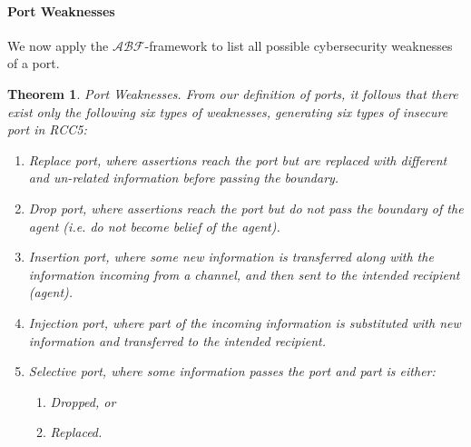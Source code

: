 \documentclass[conference]{IEEEtran}
\newcommand{\assertionRegion}{\mathcal{A}}
\newcommand{\beliefRegion}{\mathcal{B}}
\newcommand{\factRegion}{\mathcal{F}}
\newcommand{\abftheory}{\assertionRegion\beliefRegion\factRegion}
\newtheorem{theorem}{Theorem}%
\begin{document}
\paragraph{Port Weaknesses} We now apply the $\abftheory$-framework to
list all possible cybersecurity weaknesses of a port.
\begin{theorem}{Port Weaknesses.}
From our definition of ports, it follows that there exist only the following \emph{six}
types of weaknesses, generating six types of insecure port in RCC5:
\begin{enumerate}[start=1, label={W\arabic*)}]
	\item \emph{Replace port}, where assertions reach
		the port but are replaced with different and un-related information
		before passing the boundary.
	\item \emph{Drop port}, where assertions reach the
		port but do not pass the boundary of the agent (i.e. do not
		become belief of the agent).
	\item \emph{Insertion port}, where some new information is transferred along with 
		the information incoming from a channel, and then sent to
		the intended recipient (agent).
	\item \emph{Injection port}, where part of the incoming information
		is substituted with new information and transferred to the intended recipient.
	\item \emph{Selective port}, where some information passes the port and
		part is either:
	\begin{enumerate}[start=1, label={W5.\arabic*)}]
		\item Dropped, or 
		\item Replaced.
	\end{enumerate}
\end{enumerate}
\end{theorem}
\end{document}
